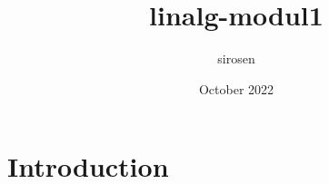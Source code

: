 \documentclass{article}
\title{linalg-modul1}
\author{sirosen }
\date{October 2022}
\begin{document}
\maketitle

\section{Introduction}
\end{document}
